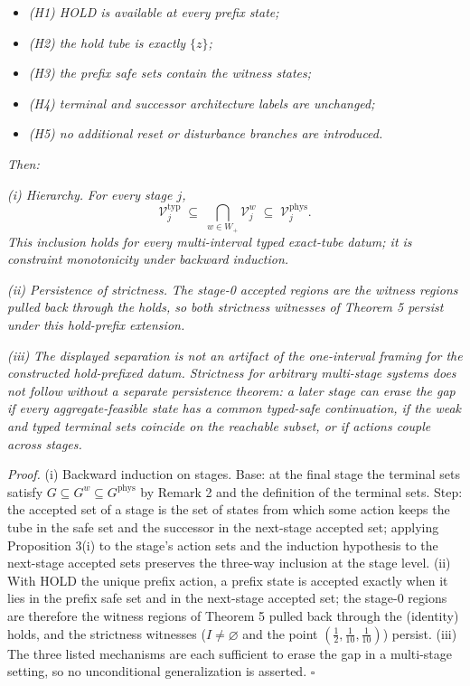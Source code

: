 \documentclass[11pt]{article}
\providecommand{\tightlist}{\setlength{\itemsep}{0pt}\setlength{\parskip}{0pt}}
\begin{document}
\begin{itemize}
\tightlist
\item
  \emph{(H1) HOLD is available at every prefix state;}
\item
  \emph{(H2) the hold tube is exactly \(\{z\}\);}
\item
  \emph{(H3) the prefix safe sets contain the witness states;}
\item
  \emph{(H4) terminal and successor architecture labels are unchanged;}
\item
  \emph{(H5) no additional reset or disturbance branches are
  introduced.}
\end{itemize}

\emph{Then:}

\emph{(i) Hierarchy.} \emph{For every stage \(j\),}
\[\mathcal{V}^{\mathrm{typ}}_j \;\subseteq\; \bigcap_{w \in W_+} \mathcal{V}^{w}_j \;\subseteq\; \mathcal{V}^{\mathrm{phys}}_j.\]
\emph{This inclusion holds for every multi-interval typed exact-tube
datum; it is constraint monotonicity under backward induction.}

\emph{(ii) Persistence of strictness.} \emph{The stage-0 accepted
regions are the witness regions pulled back through the holds, so both
strictness witnesses of Theorem 5 persist under this hold-prefix
extension.}

\emph{(iii)} \emph{The displayed separation is not an artifact of the
one-interval framing for the constructed hold-prefixed datum. Strictness
for arbitrary multi-stage systems does not follow without a separate
persistence theorem: a later stage can erase the gap if every
aggregate-feasible state has a common typed-safe continuation, if the
weak and typed terminal sets coincide on the reachable subset, or if
actions couple across stages.}

\emph{Proof.} (i) Backward induction on stages. Base: at the final stage
the terminal sets satisfy
\(G \subseteq G^w \subseteq G^{\mathrm{phys}}\) by Remark 2 and the
definition of the terminal sets. Step: the accepted set of a stage is
the set of states from which some action keeps the tube in the safe set
and the successor in the next-stage accepted set; applying Proposition
3(i) to the stage's action sets and the induction hypothesis to the
next-stage accepted sets preserves the three-way inclusion at the stage
level. (ii) With HOLD the unique prefix action, a prefix state is
accepted exactly when it lies in the prefix safe set and in the
next-stage accepted set; the stage-0 regions are therefore the witness
regions of Theorem 5 pulled back through the (identity) holds, and the
strictness witnesses (\(I \neq \varnothing\) and the point
\((\tfrac12, \tfrac1{10}, \tfrac1{10})\)) persist. (iii) The three
listed mechanisms are each sufficient to erase the gap in a multi-stage
setting, so no unconditional generalization is asserted. \ensuremath{\square}
\end{document}
